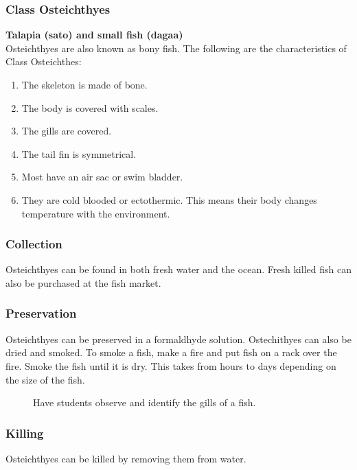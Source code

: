\subsubsection{Class Osteichthyes}

\textbf{Talapia (sato) and small fish (dagaa)}\\
Osteichthyes are also known as bony fish. The following are the characteristics of Class Osteichthes:
\begin{enumerate}
\item{The skeleton is made of bone.}
\item{The body is covered with scales.}
\item{The gills are covered.}
\item{The tail fin is symmetrical.}
\item{Most have an air sac or swim bladder.}
\item{They are cold blooded or ectothermic. This means their body changes temperature with the environment.}
\end{enumerate}



\subsubsection{Collection}
 Osteichthyes can be found in both fresh water and the ocean. Fresh killed fish can also be purchased at the fish market.

\subsubsection{Preservation} 
Osteichthyes can be preserved in a formaldhyde solution. Ostechithyes can also be dried and smoked. 
To smoke a fish, make a fire and put fish on a rack over the fire. Smoke the fish until it is dry. This takes from hours to days depending on the size of the fish.
\begin{figure}[h]
\begin{center}
\def\svgwidth{6.5cm}

\caption{Have students observe and identify the gills of a fish.}
\label{fig:fish  gills}
\end{center}
\end{figure}

\subsubsection{Killing}
Osteichthyes can be killed by removing them from water. 



